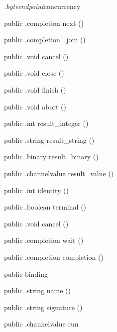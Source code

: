 \begin{CrexxClass}{\textit{.byteendpoint}}{concurrency}
\begin{Members}
    \Method
      {public}
      {.completion}
      {next}
      {()}

    \Method
      {public}
      {.completion[]}
      {join}
      {()}

    \Method
      {public}
      {.void}
      {cancel}
      {()}

    \Method
      {public}
      {.void}
      {close}
      {()}

    \Method
      {public}
      {.void}
      {finish}
      {()}

    \Method
      {public}
      {.void}
      {abort}
      {()}

    \Method
      {public}
      {.int}
      {result\_integer}
      {()}

    \Method
      {public}
      {.string}
      {result\_string}
      {()}

    \Method
      {public}
      {.binary}
      {result\_binary}
      {()}

    \Method
      {public}
      {.channelvalue}
      {result\_value}
      {()}

    \Method
      {public}
      {.int}
      {identity}
      {()}

    \Method
      {public}
      {.boolean}
      {terminal}
      {()}

    \Method
      {public}
      {.void}
      {cancel}
      {()}

    \Method
      {public}
      {.completion}
      {wait}
      {()}

    \Method
      {public}
      {.completion}
      {completion}
      {()}

    \Factory
      {public}
      {binding}
      {}

    \Method
      {public}
      {.string}
      {name}
      {()}

    \Method
      {public}
      {.string}
      {signature}
      {()}

    \Method
      {public}
      {.channelvalue}
      {run}
      {}


\end{Members}
\end{CrexxClass}
